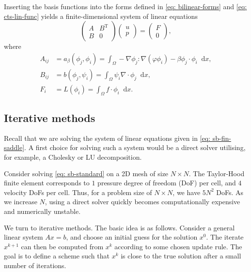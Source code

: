 \documentclass[12pt]{article}
\newcommand{\dd}{\mathop{}\!\mathrm{d}}
\theoremstyle{theorem}
\begin{document}
Inserting the basis functions into the forms defined in \eqref{eq: bilinear-forms} and \eqref{eq: cts-lin-func} yields a finite-dimensional system of linear equations
\begin{equation}\label{eq: sb-fin-saddle}
    \begin{pmatrix}
        A & B^{\mathrm{T}} \\
        B & 0
    \end{pmatrix}
    \begin{pmatrix}
        u \\
        p
    \end{pmatrix}
    =
    \begin{pmatrix}
        F \\
        0
    \end{pmatrix},
\end{equation}
where
\begin{align}
    A_{ij} &= a_\beta(\phi_j, \phi_i) = \int_\Omega -\nabla \phi_j : \nabla(\varphi \phi_i) - \beta \phi_j \cdot \phi_i \dd x, \\
    B_{ij} &= b(\phi_j, \psi_i) = \int_\Omega \psi_i \nabla \cdot \phi_j \dd x,\\
    F_i &= L(\phi_i) = \int_\Omega f \cdot \phi_i \dd x.
\end{align}

\subsection{Iterative methods}\label{sec: iterative}

Recall that we are solving the system of linear equations given in \eqref{eq: sb-fin-saddle}. A first choice for solving such a system would be a direct solver utilising, for example, a Cholesky or LU decomposition.

Consider solving \eqref{eq: sb-standard} on a 2D mesh of size $N \times N$. The Taylor-Hood finite element corresponds to $1$ pressure degree of freedom (DoF) per cell, and $4$ velocity DoFs per cell. Thus, for a problem size of $N \times N$, we have $5 N^2$ DoFs. As we increase $N$, using a direct solver quickly becomes computationally expensive and numerically unstable.

We turn to iterative methods. The basic idea is as follows. Consider a general linear system $Ax=b$, and choose an initial guess for the solution $x^0$. The iterate $x^{k+1}$ can then be computed from $x^k$ according to some chosen update rule. The goal is to define a scheme such that $x^k$ is close to the true solution after a small number of iterations. 
\end{document}
